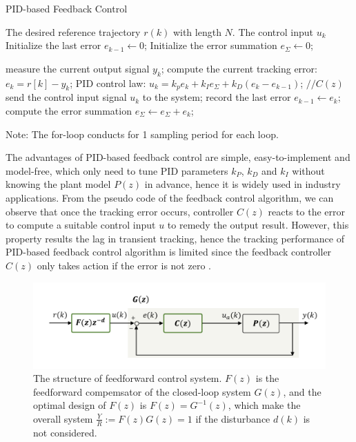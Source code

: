 \documentclass[a4paper, 12pt, twoside, openright]{mythesis}
\begin{document}
\begin{algorithm}[htbp]
 \caption{PID-based Feedback Control}
  \label{alg:PID}
  \begin{algorithmic}[1]
    \Require The desired reference trajectory $r(k)$ with length $N$.
    \Ensure The control input $u_{k}$ 
    \State Initialize the last error $e_{k-1} \gets 0$;
    \State Initialize the error summation $e_{\Sigma} \gets 0$;
    
     \State measure the current output signal $y_{k}$;
     \State compute the current tracking error: $e_{k}=r[k]-y_{k}$;
     \State PID control law: $u_{k}=k_{p}e_{k}+k_{I}e_{\Sigma}+k_D(e_{k}-e_{k-1})$; $//C(z)$
     \State send the control input signal $u_{k}$ to the system;
     \State record the last error $e_{k-1} \gets e_{k}$;
     \State compute the error summation $e_{\Sigma} \gets e_{\Sigma}+e_{k}$;
    \EndFor
	
	\State Note: The for-loop conducts for 1 sampling period for each loop.
  \end{algorithmic}
\end{algorithm}

The advantages of PID-based feedback control are simple, easy-to-implement and model-free, which only need to tune PID parameters $k_{P}$, $k_{D}$ and $k_{I}$ without knowing the plant model $P(z)$ in advance, hence it is widely used in industry applications. From the pseudo code of the feedback control algorithm, we can observe that once the tracking error occurs, controller $C(z)$ reacts to the error to compute a suitable control input $u$ to remedy the output result. However, this property results the lag in transient tracking, hence the tracking performance of PID-based feedback control algorithm is limited since the feedback controller $C(z)$ only takes action if the error is not zero \cite{ oomen2020learning}.


\begin{figure}
 	\begin{center}
   	\includegraphics[width=1\linewidth] {image/FF_Ctrl}
 	\caption{The structure of feedforward control system. $F(z)$ is the feedforward compemsator of the closed-loop system $G(z)$, and the optimal design of $F(z)$ is $F(z)=G^{-1}(z)$, which make the overall system $\frac{Y}{R}:=F(z)G(z)=1$ if the disturbance $d(k)$ is not considered.}
 	\label{fig:FF_Ctrl}
 	\end{center}
\end{figure}
\end{document}

